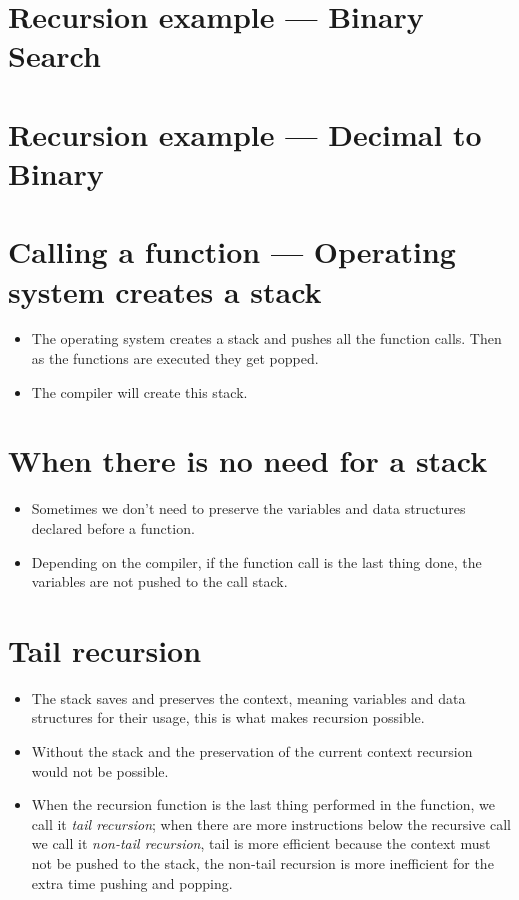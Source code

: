 \section{Recursion example —  Binary Search}

\section{Recursion example — Decimal to Binary}


\section{Calling a function — Operating system creates a stack}
\begin{itemize}
    \item The operating system creates a stack and pushes all the function calls. Then as the functions are executed they get popped. 
    \item The compiler will create this stack. 
\end{itemize}


\section{When there is no need for a stack}
\begin{itemize}
    \item Sometimes we don't need to preserve the variables and data structures declared before a function. 
    \item Depending on the compiler, if the function call is the last thing done, the variables are not pushed to the call stack. 
\end{itemize}


\section{Tail recursion}
\begin{itemize}
    \item The stack saves and preserves the context, meaning variables and data structures for their usage, this is what makes recursion possible. 
    \item Without the stack and the preservation of the current context recursion would not be possible.
    \item When the recursion function is the last thing performed in the function, we call it \emph{tail recursion}; when there are more instructions below the recursive call we call it \emph{non-tail recursion}, tail is more efficient because the context must not be pushed to the stack, the non-tail recursion is more inefficient for the extra time pushing and popping. 
\end{itemize}


